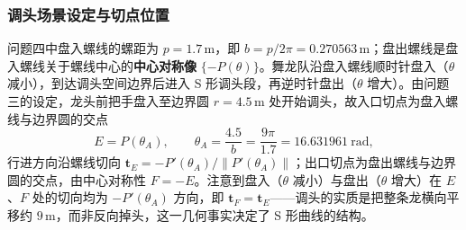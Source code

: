 ﻿\documentclass{cumcmthesis}
\begin{document}
\subsubsection{调头场景设定与切点位置}
问题四中盘入螺线的螺距为 $p=1.7\,\text{m}$，即 $b=p/2\pi=0.270563\,\text{m}$；盘出螺线是盘入螺线关于螺线中心的\textbf{中心对称像} $\{-P(\theta)\}$。舞龙队沿盘入螺线顺时针盘入（$\theta$ 减小），到达调头空间边界后进入 S 形调头段，再逆时针盘出（$\theta$ 增大）。由问题三的设定，龙头前把手盘入至边界圆 $r=4.5\,\text{m}$ 处开始调头，故入口切点为盘入螺线与边界圆的交点
\begin{equation}
E=P(\theta_A),\qquad \theta_A=\frac{4.5}{b}=\frac{9\pi}{1.7}=16.631961\ \text{rad},
\end{equation}
行进方向沿螺线切向 $\mathbf{t}_E=-P'(\theta_A)/\|P'(\theta_A)\|$；出口切点为盘出螺线与边界圆的交点，由中心对称性 $F=-E$。注意到盘入（$\theta$ 减小）与盘出（$\theta$ 增大）在 $E$、$F$ 处的切向均为 $-P'(\theta_A)$ 方向，即 $\mathbf{t}_F=\mathbf{t}_E$——调头的实质是把整条龙横向平移约 $9\,\text{m}$，而非反向掉头，这一几何事实决定了 S 形曲线的结构。
\end{document}
